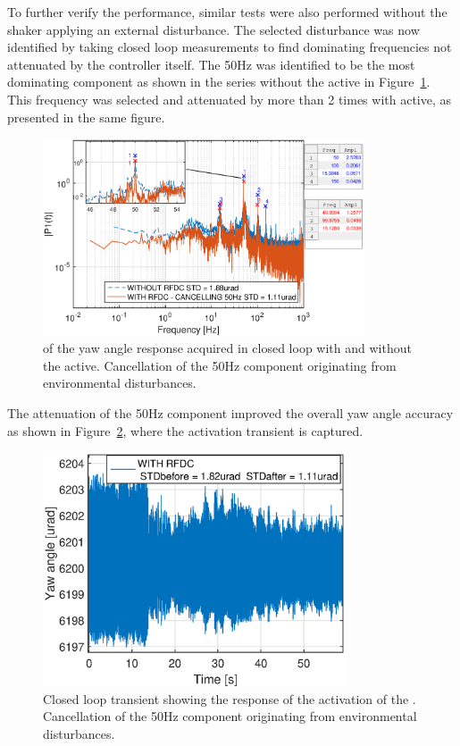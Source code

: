 To further verify the performance, similar tests were also performed without the shaker applying an external disturbance. The selected disturbance was now identified by taking closed loop measurements to find dominating frequencies not attenuated by the controller itself. The 50Hz was identified to be the most dominating component as shown in the series without the \abbrRFDC active in Figure~\ref{fig:fft_closedloop_50}. This frequency was selected and attenuated by more than 2 times with \abbrRFDC active, as presented in the same figure.

\begin{figure}[h]
  \centering %
  \includegraphics[width=0.85\textwidth]{fig/matlab/fft_closedloop_50Hz}
  \caption{\label{fig:fft_closedloop_50}\abbrFFT of the yaw angle response acquired in closed loop with and without the \abbrRFDC active. Cancellation of the 50Hz component originating from environmental disturbances.}
\end{figure}

The attenuation of the 50Hz component improved the overall yaw angle accuracy as shown in Figure~\ref{fig:transient_closedloop_50}, where the activation transient is captured.
\FloatBarrier
\begin{figure}[h]
  \centering %
  \includegraphics[width=0.8\textwidth]{fig/matlab/transient_closedloop_50Hz}
  \caption{\label{fig:transient_closedloop_50}Closed loop transient showing the response of the activation of the \abbrRFDC. Cancellation of the 50Hz component originating from environmental disturbances.}
\end{figure}


